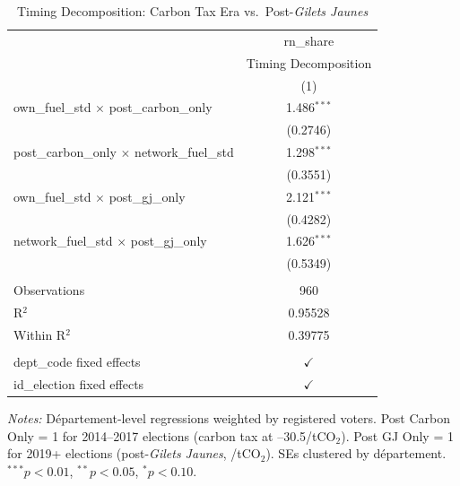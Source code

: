\begin{table}[htbp]
   \caption{\label{tab:timing_decomp} Timing Decomposition: Carbon Tax Era vs.\ Post-\textit{Gilets Jaunes}}
   \bigskip
   \centering
   \begin{tabular}{lc}
      \toprule
                                                          & rn\_share\\   
                                                          & Timing Decomposition \\   
                                                          & (1)\\  
      \midrule 
      own\_fuel\_std $\times$ post\_carbon\_only          & 1.486$^{***}$\\   
                                                          & (0.2746)\\   
      post\_carbon\_only $\times$ network\_fuel\_std      & 1.298$^{***}$\\   
                                                          & (0.3551)\\   
      own\_fuel\_std $\times$ post\_gj\_only              & 2.121$^{***}$\\   
                                                          & (0.4282)\\   
      network\_fuel\_std $\times$ post\_gj\_only          & 1.626$^{***}$\\   
                                                          & (0.5349)\\   
       \\
      Observations                                        & 960\\  
      R$^2$                                               & 0.95528\\  
      Within R$^2$                                        & 0.39775\\  
       \\
      dept\_code fixed effects                            & $\checkmark$\\   
      id\_election fixed effects                          & $\checkmark$\\   
      \bottomrule
   \end{tabular}
   
   \par \raggedright 
   \textit{Notes:} D\'{e}partement-level regressions weighted by registered voters. Post Carbon Only = 1 for 2014--2017 elections (carbon tax at --30.5/tCO$_2$). Post GJ Only = 1 for 2019+ elections (post-\textit{Gilets Jaunes}, /tCO$_2$). SEs clustered by d\'{e}partement. $^{***}p<0.01$, $^{**}p<0.05$, $^{*}p<0.10$.
\end{table}
